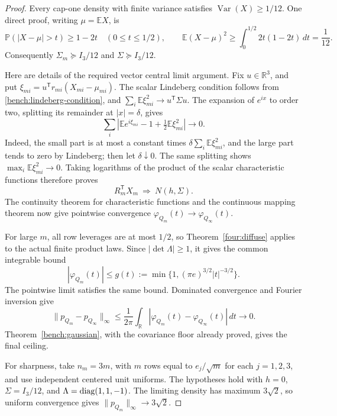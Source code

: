 \begin{proof}
Every cap-one density with finite variance satisfies
\(\operatorname{Var}(X)\geq1/12\).  One direct proof, writing
\(\mu=\mathbb EX\), is
\[
 \mathbb P(|X-\mu|>t)\geq1-2t\quad(0\leq t\leq1/2),
 \qquad
 \mathbb E(X-\mu)^2
 \geq\int_0^{1/2}2t(1-2t)\,dt=\frac1{12}.
\]
Consequently \(\Sigma_m\succeq I_3/12\) and
\(\Sigma\succeq I_3/12\).

Here are details of the required vector central limit argument.
Fix \(u\in\mathbb R^3\), and put
\(\xi_{mi}=u^{\mathsf T}r_{mi}(X_{mi}-\mu_{mi})\).
The scalar Lindeberg condition follows from
\eqref{bench:lindeberg-condition}, and
\(\sum_i\mathbb E\xi_{mi}^2\to u^{\mathsf T}\Sigma u\).
The expansion of \(e^{ix}\) to order two, splitting its remainder
at \(|x|=\delta\), gives
\[
 \sum_i\left|
  \mathbb Ee^{i\xi_{mi}}-1+\tfrac12\mathbb E\xi_{mi}^2
            \right|\longrightarrow0.
\]
Indeed, the small part is at most a constant times
\(\delta\sum_i\mathbb E\xi_{mi}^2\), and the large part tends to
zero by Lindeberg; then let \(\delta\downarrow0\).
The same splitting shows
\(\max_i\mathbb E\xi_{mi}^2\to0\).
Taking logarithms of the product of the scalar characteristic
functions therefore proves
\[
 R_m^{\mathsf T}X_m\ \Longrightarrow\ N(h,\Sigma).
\]
The continuity theorem for characteristic functions and the continuous
mapping theorem now give pointwise convergence
\(\varphi_{Q_m}(t)\to\varphi_{Q_\infty}(t)\).

For large \(m\), all row leverages are at most \(1/2\), so
Theorem~\ref{four:diffuse} applies to the actual finite product laws.
Since \(|\det\Lambda|\geq1\), it gives the common integrable bound
\[
 |\varphi_{Q_m}(t)|\leq
 g(t):=\min\{1,(\pi e)^{3/2}|t|^{-3/2}\}.
\]
The pointwise limit satisfies the same bound.  Dominated convergence
and Fourier inversion give
\[
 \|p_{Q_m}-p_{Q_\infty}\|_\infty
 \leq\frac1{2\pi}\int_{\mathbb R}
       |\varphi_{Q_m}(t)-\varphi_{Q_\infty}(t)|\,dt
 \longrightarrow0.
\]
Theorem~\ref{bench:gaussian}, with the covariance floor already proved,
gives the final ceiling.

For sharpness, take \(n_m=3m\), with \(m\) rows equal to
\(e_j/\sqrt m\) for each \(j=1,2,3\), and use independent centered
unit uniforms.  The hypotheses hold with \(h=0\),
\(\Sigma=I_3/12\), and \(\Lambda=\operatorname{diag}(1,1,-1)\).
The limiting density has maximum \(3\sqrt2\), so uniform convergence
gives \(\|p_{Q_m}\|_\infty\to3\sqrt2\).
\end{proof}

